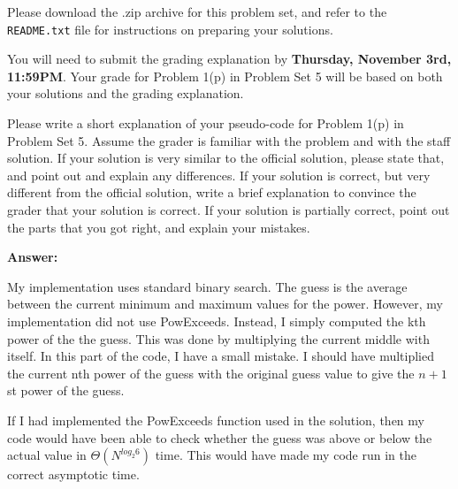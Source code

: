 \documentclass[12pt,twoside]{article}
\newcommand{\theproblemsetnum}{5E}
\newcommand{\releasedate}{November 1, 2011}
\begin{document}
\handout{Problem Set \theproblemsetnum}{\releasedate}
Please download the .zip archive for this problem set, and refer to the
\texttt{README.txt} file for instructions on preparing your solutions.

You will need to submit the grading explanation by \textbf{Thursday, November
3rd, 11:59PM}. Your grade for Problem 1(p) in Problem Set 5 will be based on
both your solutions and the grading explanation.
\medskip

\hrulefill

\begin{problems}

\problem Please write a short explanation of your pseudo-code for Problem 1(p)
in Problem Set 5. Assume the grader is familiar with the problem and with the
staff solution. If your solution is very similar to the official solution,
please state that, and point out and explain any differences. If your solution
is correct, but very different from the official solution, write a brief
explanation to convince the grader that your solution is correct. If your
solution is partially correct, point out the parts that you got right, and
explain your mistakes.

\textbf{Answer:}

My implementation uses standard binary search. The guess is the average between the current minimum and maximum values for the power. However, my implementation did not use PowExceeds. Instead, I simply computed the kth power of the the guess. This was done by multiplying the current middle with itself. In this part of the code, I have a small mistake. I should have multiplied the current nth power of the guess with the original guess value to give the $n + 1$st power of the guess.

If I had implemented the PowExceeds function used in the solution, then my code would have been able to check whether the guess was above or below the actual value in $\Theta(N^{log_2{6}})$ time. This would have made my code run in the correct asymptotic time. 

\end{problems}
\end{document}
